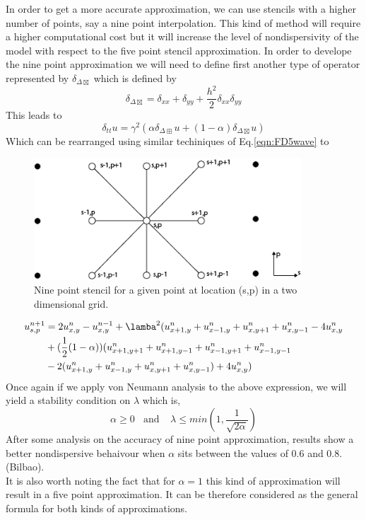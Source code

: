 In order to get a more accurate approximation, we can use stencils with a higher number of points, say a nine point interpolation. This kind of method will require a higher computational cost but it will increase the level of nondispersivity of the model with respect to the five point stencil approximation.
In order to develope the nine point approximation we will need to define first another type of operator represented by $\delta_{\Delta\boxtimes}$ which is defined by
\begin{equation}
	\delta_{\Delta\boxtimes}=\delta_{xx}+\delta_{yy} +\frac{h^2}{2}\delta_{xx}\delta_{yy}
\end{equation}
This leads to
\begin{equation}
	\delta_{tt}u=\gamma^{2}(\alpha\delta_{\Delta\boxplus} u + (1-\alpha)\delta_{\Delta\boxtimes}u)
\end {equation}
Which can be rearranged using similar techiniques of Eq.\ref{eqn:FD5wave} to
\begin{figure}[tb!]
\begin{center}
\includegraphics[width=10cm]{./Chapter_3/_Figs/9point.png}
\caption{Nine point stencil for a given point at location (s,p) in a two dimensional grid.}
\label{figs:9point}
\end{center}
\end{figure}
\begin{equation}
\label{eqn:FD9wave}
	\begin{align}
		u^{n+1}_{s,p}&=2u^{n}_{x,y}-u^{n-1}_{x,y}+\lamba^{2}(u^{n}_{x+1,y}+u^{n}_{x-1,y}+u^{n}_{x,y+1}+u^{n}_{x,y-1}-4u^{n}_{x,y}\\
				    &+(\frac{1}{2}(1-\alpha))(u^{n}_{x+1,y+1}+u^{n}_{x+1,y-1}+u^{n}_{x-1,y+1}+u^{n}_{x-1,y-1}\\
				    & -2(u^{n}_{x+1,y}+u^{n}_{x-1,y}+u^{n}_{x,y+1}+u^{n}_{x,y-1})+4u^{n}_{x,y} )
	\end{align}
\end{equation}
Once again if we apply von Neumann analysis to the above expression, we will yield a stability condition on $\lambda$ which is,
\begin{equation}
	\alpha \geq 0  \ \ \ \ \text{and} \ \ \ \ \    \lambda\leq min(1,\frac{1}{\sqrt{2\alpha}}) 
\end{equation}
After some analysis on the accuracy of nine point approximation, results show a better nondispersive behaivour when $\alpha$ sits between the values of 0.6 and 0.8.(Bilbao).\\
It is also worth noting the fact that for $\alpha=1$ this kind of approximation will result in a five point approximation. It can be therefore considered as the general formula for both kinds of approximations.\\

